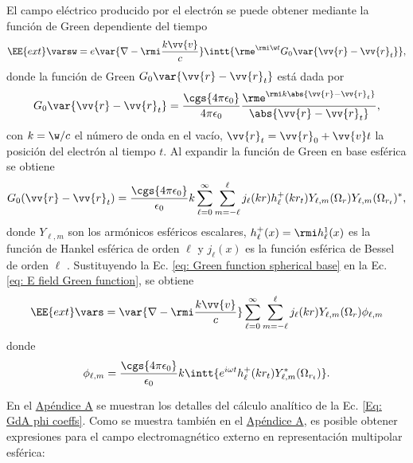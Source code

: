 El campo eléctrico producido por el electrón se puede obtener mediante la función de Green dependiente del tiempo \cite{maciel2019electromagnetic}  
\begin{equation}
\EE{ext}\varsw = e\var{\nabla-\rmi \frac{k\vv{v}}{c}} \intt{\rme^{\rmi \w t} G_0 \var{\vv{r}-\vv{r}_t}},
\label{eq: E field Green function}
\end{equation}
donde la función de Green $G_0 \var{\vv{r}-\vv{r}_t}$ está dada por 
\begin{equation}
G_0 \var{\vv{r}-\vv{r}_t} = \frac{\cgs{4\pi\epsilon_0}}{4\pi\epsilon_0}\frac{\rme^{\rmi k \abs{\vv{r}-\vv{r}_t}}}{\abs{\vv{r}-\vv{r}_t}},
\end{equation}
con $k = \w/c$ el número de onda en el vacío, $\vv{r}_t=\vv{r}_0+\vv{v}t$ la posición del electrón al tiempo $t$. Al expandir la función de Green en base esférica se obtiene \cite{de1999relativistic}
\begin{equation}
G_0(\vv{r}-\vv{r}_t) = \frac{\cgs{4\pi\epsilon_0}}{\epsilon_0} k \sum_{\ell = 0}^{\infty} \sum_{m=-\ell}^{\ell} j_{\ell}(kr) h_{\ell}^{+}(k r_t) Y_{\ell, m}(\Omega_r) Y_{\ell, m}(\Omega_{r_t})^{*},
\label{eq: Green function spherical base}
\end{equation}
donde $Y_{\ell,m}$ son los armónicos esféricos escalares, $h_{\ell}^{+}(x) = \rmi h_{\ell}^{1}(x)$ es la función de Hankel esférica de orden $\ell$ y $j_{\ell}(x)$ es la función esférica de Bessel de orden $\ell$ \citep{Abramowitz}. Sustituyendo la Ec. \eqref{eq: Green function spherical base} en la Ec. \eqref{eq: E field Green function}, se obtiene
\begin{equation}
\EE{ext}\vars = \var{\nabla-\rmi \frac{k\vv{v}}{c}} \sum_{\ell = 0}^{\infty} \sum_{m=-\ell}^{\ell} j_{\ell}(kr) Y_{\ell, m}(\Omega_{r})\phi_{\ell, m}
\end{equation}
donde 
\begin{equation}
\phi_{\ell, m} = \frac{\cgs{4\pi\epsilon_0}}{\epsilon_0} k \intt{e^{i \omega t} h_{\ell}^{+}(k r_{t}) Y_{\ell, m}^{*}(\Omega_{r_t}) }.
\label{Eq: GdA phi coeffs}
\end{equation}

En el \hyperref[AppendixScalarPotentials]{Apéndice A} se muestran los detalles del cálculo analítico de la Ec. \eqref{Eq: GdA phi coeffs}. Como se muestra también en el \hyperref[AppendixScalarPotentials]{Apéndice A}, es posible obtener expresiones para el campo electromagnético externo en representación multipolar esférica:

